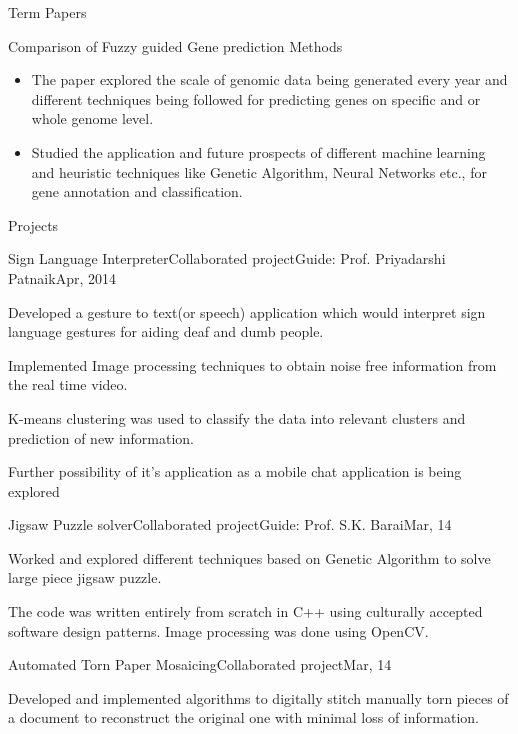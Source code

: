 \documentclass{article}
\newlength{\tabin}
\newlength{\secsep}
\newcommand{\lineunder}{\vspace*{-8pt} \\ \hspace*{-6pt} \hrulefill \\ \vspace*{-15pt}}
\newenvironment{tabbedsection}[1]{
  \begin{list}{}{
      \setlength{\itemsep}{0pt}
      \setlength{\labelsep}{0pt}
      \setlength{\labelwidth}{0pt}
      \setlength{\leftmargin}{\tabin}
      \setlength{\rightmargin}{\tabin}
      \setlength{\listparindent}{0pt}
      \setlength{\parsep}{0pt}
      \setlength{\parskip}{0pt}
      \setlength{\partopsep}{0pt}
      \setlength{\topsep}{#1}
    }
  \item[]
}{\end{list}}
\newenvironment{resume_section}[1]{
  \filbreak
  \vspace{2\secsep}
  \textsc{\large#1}
  \lineunder
  \begin{tabbedsection}{\secsep}
}{\end{tabbedsection}}
\newenvironment{resume_subsection}[2][]{
  \textbf{#2} \hfill {\footnotesize #1} \hspace{1.0em}
  \begin{tabbedsection}{0.5\secsep}
}{\end{tabbedsection}}
\newenvironment{subitems}{
  \renewcommand{\labelitemi}{-}
  \begin{itemize}
      \setlength{\labelsep}{1em}
}{\end{itemize}}
\newenvironment{resume_employer}[4]{
  \vspace{\secsep}
  \textbf{#1} \\ 
  \indent {\small #2} \hfill\hspace{1em}{\footnotesize#3 (#4)}
  \begin{tabbedsection}{0pt}
  \begin{subitems}
}{\end{subitems}\end{tabbedsection}}
\begin{document}
\begin{resume_section}  {Term Papers }
  \begin{resume_subsection}{Comparison of Fuzzy guided Gene prediction Methods}
    \begin{subitems}
      \item The paper explored the scale of genomic data being generated every year and different techniques being followed for predicting genes on specific and or whole genome level.
      \item Studied the application and future prospects of different machine learning and heuristic techniques like Genetic Algorithm, Neural Networks etc., for gene annotation and classification.
    \end{subitems}
    \end{resume_subsection}
\end{resume_section}

\begin{resume_section}{Projects}
  \begin{resume_employer}{Sign Language Interpreter}{Collaborated project}{Guide: Prof. Priyadarshi Patnaik}{Apr, 2014}
    \item Developed a gesture to text(or speech) application which would interpret sign language gestures for aiding deaf and dumb people.
    \item Implemented Image processing techniques to obtain noise free information from the real time video.
    \item K-means clustering was used to classify the data into relevant clusters and prediction of new information.
    \item Further possibility of it's application as a mobile chat application is being explored
  \end{resume_employer}

  \begin{resume_employer}{Jigsaw Puzzle solver}{Collaborated project}{Guide: Prof. S.K. Barai}{Mar, 14}
    \item Worked and explored different techniques based on Genetic Algorithm to solve large piece jigsaw puzzle.
    \item The code was written entirely from scratch in C++ using culturally accepted software design patterns. Image processing was done using OpenCV.
  \end{resume_employer}

  \begin{resume_employer}{Automated Torn Paper Mosaicing}{Collaborated project}{}{Mar, 14}
    \item Developed and implemented algorithms to digitally stitch manually torn pieces of a document to reconstruct the original one with minimal loss of information.
  \end{resume_employer}
\end{resume_section}
\end{document}

